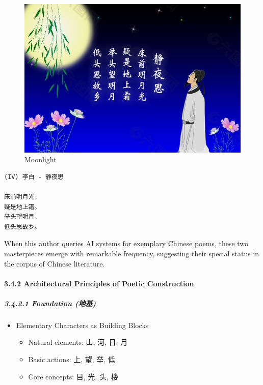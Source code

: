 \begin{figure}
\centering
\includegraphics{./images/poem_moonlight.jpg}
\caption{Moonlight}
\end{figure}

\begin{verbatim}
(IV) 李白 - 静夜思

床前明月光，
疑是地上霜。
举头望明月，
低头思故乡。
\end{verbatim}

When this author queries AI systems for exemplary Chinese poems, these
two masterpieces emerge with remarkable frequency, suggesting their
special status in the corpus of Chinese literature.

\hypertarget{architectural-principles-of-poetic-construction}{%
\paragraph{3.4.2 Architectural Principles of Poetic
Construction}\label{architectural-principles-of-poetic-construction}}

\hypertarget{foundation-ux5730ux57fa}{%
\subparagraph{3.4.2.1 Foundation (地基)}\label{foundation-ux5730ux57fa}}

\begin{itemize}
\tightlist
\item
  Elementary Characters as Building Blocks

  \begin{itemize}
  \tightlist
  \item
    Natural elements: 山, 河, 日, 月
  \item
    Basic actions: 上, 望, 举, 低
  \item
    Core concepts: 目, 光, 头, 楼
  \end{itemize}
\end{itemize}

